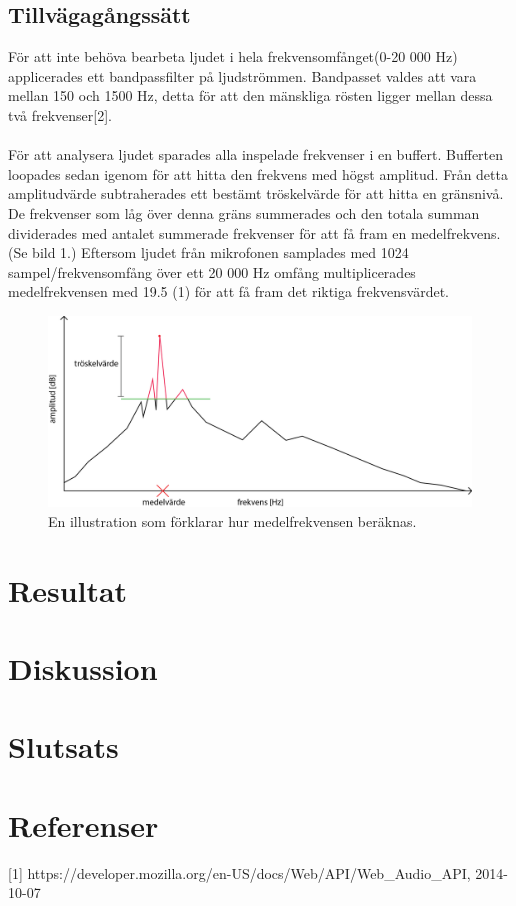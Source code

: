 \documentclass[12pt, titlepage, twoside, a4paper]{article}
\begin{document}
		\subsection{Tillvägagångssätt}
			För att inte behöva bearbeta ljudet i hela frekvensomfånget(0-20 000 Hz) applicerades ett bandpassfilter på ljudströmmen. Bandpasset valdes att vara mellan 150 och 1500 Hz, detta för att den mänskliga rösten ligger mellan dessa två frekvenser[2].
			\\ \\
			För att analysera ljudet sparades alla inspelade frekvenser i en buffert. Bufferten loopades sedan igenom för att hitta den frekvens med högst amplitud. Från detta amplitudvärde subtraherades ett bestämt tröskelvärde för att hitta en gränsnivå. De frekvenser som låg över denna gräns summerades och den totala summan dividerades med antalet summerade frekvenser för att få fram en medelfrekvens. (Se bild 1.) Eftersom ljudet från mikrofonen samplades med 1024 sampel/frekvensomfång över ett 20 000 Hz omfång multiplicerades medelfrekvensen med 19.5 (1) för att få fram det riktiga frekvensvärdet.
			\begin{figure}[h!]
				\centering
					\includegraphics[width=1\textwidth]{explanation.png}
  						\caption{En illustration som förklarar hur medelfrekvensen beräknas.}
			\end{figure}

	\section{Resultat}
	\section{Diskussion}
	\section{Slutsats}
	\section{Referenser}
		[1] https://developer.mozilla.org/en-US/docs/Web/API/Web\_Audio\_API, 2014-10-07
\end{document}
